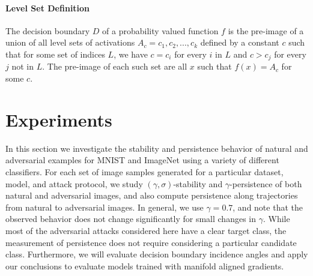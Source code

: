 
\paragraph{Level Set Definition}

The decision boundary $D$ of a probability valued function $f$ is the pre-image of a union of all level sets of activations $A_c = {c_1, c_2, ..., c_k}$ defined by a constant $c$ such that for some set of indices $L$, we have $c = c_i$ for every $i$ in $L$ and $c > c_j$ for every $j$ not in $L$. The pre-image of each such set are all $x$ such that $f(x) = A_c$ for some $c$. 



\section{Experiments} \label{sec:experiments}



In this section we investigate the stability and persistence behavior of natural and adversarial examples for MNIST \citep{MNIST} and ImageNet \citep{ILSVRC15} using a variety of different classifiers. For each set of image samples generated for a particular dataset, model, and attack protocol, we study $(\gamma,\sigma)$-stability and $\gamma$-persistence of both natural and adversarial images, and also compute persistence along trajectories from natural to adversarial images. In general, we use $\gamma = 0.7$, and note that the observed behavior does not change significantly for small changes in $\gamma$. While most of the adversarial attacks considered here have a clear target class, the measurement of persistence does not require considering a particular candidate class.  Furthermore, we will evaluate decision boundary incidence angles and apply our conclusions to evaluate models trained with manifold aligned gradients. 





